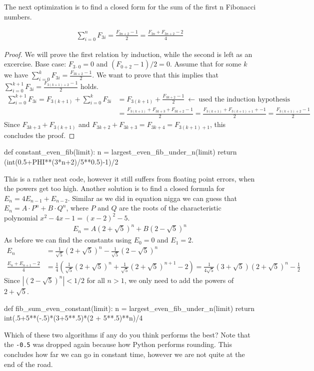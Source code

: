 The next optimization is to find a closed form for the sum of the first n Fibonacci numbers. 
%
\begin{proposition}
	\begin{align*}
		  \sum_{i=0}^n F_{3i} 
		= \frac{F_{3n+2}-1}{2}
		= \frac{F_{3n} + F_{3n+2} - 2}{4}
	\end{align*}
\end{proposition}
%
\begin{proof}
	We will prove the first relation by induction, while the second is left as an excercise. 
	Base case: $F_{3\cdot0} = 0$ and $(F_{0+2}-1)/2 = 0$. Assume that 
	for some $k$ we have $\sum_{i=0}^k F_{3i} = \frac{F_{3k+2}-1}{2}$. We want to prove 
	that this implies that $\sum_{i=0}^{k+1} F_{3i} = \frac{F_{3(k+1)+2}-1}{2}$ holds. 
	\begin{align*}
		    \sum_{i=0}^{k+1} F_{3i}
		  = F_{3(k+1)} + \sum_{i=0}^{k} F_{3i} 
		& = F_{3(k+1)} + \frac{F_{3k+2}-1}{2} \ \leftarrow \ \text{used the induction hypothesis} \\
		& = \frac{F_{3(k+1)} + F_{3k+3} + F_{3k+2} - 1}{2} 
		  = \frac{F_{3(k+1)} + F_{3(k+1)+1} + - 1}{2} 
		  = \frac{F_{3(k+1)+2}-1}{2}
	\end{align*}
Since $F_{3k+3} + F_{3(k+1)}$ and $F_{3k+2} + F_{3k+3}=F_{3k+4}=F_{3(k+1)+1}$, this concludes the proof.
\end{proof}
%
\begin{pythoncode}
	def constant_even_fib(limit):
	    n = largest_even_fib_under_n(limit)
	    return (int(0.5+PHI**(3*n+2)/5**0.5)-1)/2
\end{pythoncode}
%
This is a rather neat code, however it still suffers from floating point errors, when the powers get too high.
Another solution is to find a closed formula for $E_n = 4 E_{n-1} + E_{n-2}$. Similar as we did in equation nigga we can guess that
$E_n = A \cdot P^n + B \cdot Q^n$, where $P$ and $Q$ are the roots of the characteristic polynomial $x^2 - 4x -1 = (x-2)^2 -5$. 
%
\begin{align*}
	E_n = A (2 + \sqrt{5})^n + B (2 - \sqrt{5})^n
\end{align*}
%
As before we can find the constants using $E_0 = 0$ and $E_1 = 2$.
%
\begin{align*}
	     E_n 
	& = \frac{1}{\sqrt{5}} (2 + \sqrt{5})^n - \frac{1}{\sqrt{5}} (2 - \sqrt{5})^n \\
	    \frac{E_n + E_{n+1}-2}{4}
	& = \frac{1}{4}\left( \frac{1}{\sqrt{5}} (2 + \sqrt{5})^n  + \frac{1}{\sqrt{5}} (2 + \sqrt{5})^{n+1}  - 2 \right) 
	  = \frac{1}{4\sqrt{5}} ( 3 + \sqrt{5} ) (2 + \sqrt{5})^{n} - \frac{1}{2}
\end{align*}
%
Since $\left| (2 - \sqrt{5})^n \right| < 1/2$ for all $n>1$, we only need to add the powers of $2 + \sqrt{5}$.
%
\begin{pythoncode}
def fib_sum_even_constant(limit):
    n = largest_even_fib_under_n(limit)
    return int(.5+5**(-.5)*(3+5**.5)*(2 + 5**.5)**n)/4
\end{pythoncode}
%
Which of these two algorithms if any do you think performs the best? Note that the \verb|-0.5| 
was dropped again because how Python performs rounding. This concludes how far we can go in constant time,
however we are not quite at the end of the road.
%
